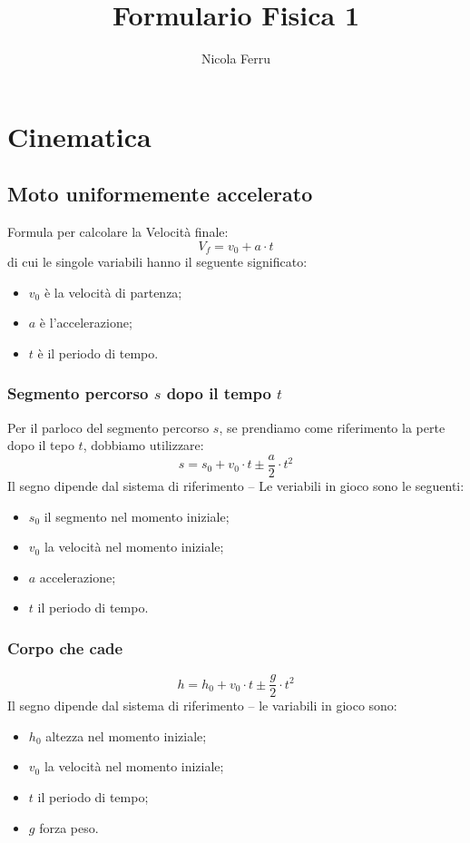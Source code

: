\documentclass{book}
\title{Formulario Fisica 1}
\author{Nicola Ferru}
\begin{document}
\maketitle
\tableofcontents

\chapter{Cinematica}
\label{sec:cin}

\section{Moto uniformemente accelerato}
\label{sec:motouniacc}

Formula per calcolare la Velocità finale:
\begin{equation}
  \label{eq:vf}
  V_f=v_0+a\cdot t
\end{equation}
di cui le singole variabili hanno il seguente significato:
\begin{itemize}
\item $v_0$ è la velocità di partenza;
\item $a$ è l'accelerazione;
\item $t$ è il periodo di tempo.
\end{itemize}

\subsection{Segmento percorso $s$ dopo il tempo $t$}
\label{sec:segPDTempt}
Per il parloco del segmento percorso $s$, se prendiamo come riferimento la perte dopo il tepo $t$, dobbiamo utilizzare:
\begin{equation}
  \label{eq:segperdopot}
  s=s_0+v_0\cdot t \pm \frac{a}{2}\cdot t^2
\end{equation}
Il segno dipende dal sistema di riferimento -- Le veriabili in gioco sono le seguenti:
\begin{itemize}
\item $s_0$ il segmento nel momento iniziale;
\item $v_0$ la velocità nel momento iniziale;
\item $a$ accelerazione;
\item $t$ il periodo di tempo.
\end{itemize}

\subsection{Corpo che cade}
\label{sec:corpochecade}
\begin{equation}
  \label{eq:altezzadicaduta}
  h=h_0+v_0\cdot t \pm \frac{g}{2}\cdot t^2
\end{equation}
Il segno dipende dal sistema di riferimento -- le variabili in gioco sono:
\begin{itemize}
\item $h_0$ altezza nel momento iniziale;
\item $v_0$ la velocità nel momento iniziale;
\item $t$ il periodo di tempo;
\item $g$ forza peso.
\end{itemize}
\end{document}
